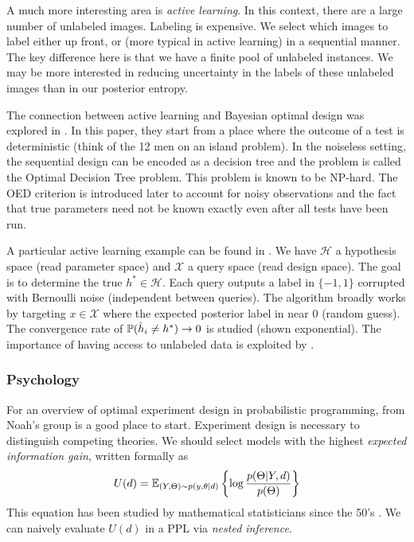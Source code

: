 A much more interesting area is \textit{active learning}. In this context, there are a large number of unlabeled images. Labeling is expensive. We select which images to label either up front, or (more typical in active learning) in a sequential manner. The key difference here is that we have a finite pool of unlabeled instances. We may be more interested in reducing uncertainty in the labels of these unlabeled images than in our posterior entropy.

The connection between active learning and Bayesian optimal design was explored in \cite{golovin2010}. In this paper, they start from a place where the outcome of a test is deterministic (think of the 12 men on an island problem). In the noiseless setting, the sequential design can be encoded as a decision tree and the problem is called the Optimal Decision Tree problem. This problem is known to be NP-hard. The OED criterion is introduced later to account for noisy observations and the fact that true parameters need not be known exactly even after all tests have been run.

A particular active learning example can be found in \cite{nowak2009}. We have $\mathcal{H}$ a hypothesis space (read parameter space) and $\mathcal{X}$ a query space (read design space). The goal is to determine the true $h^* \in \mathcal{H}$. Each query outputs a label in $\{-1, 1\}$ corrupted with Bernoulli noise (independent between queries). The algorithm broadly works by targeting $x \in \mathcal{X}$ where the expected posterior label in near $0$ (random guess). The convergence rate of $\mathbb{P}(\hat{h}_i \ne h^*) \to 0$ is studied (shown exponential). The importance of having access to unlabeled data is exploited by \cite{dasgupta2006}.

\subsubsection{Psychology}
For an overview of optimal experiment design in probabilistic programming, \cite{ouyang2016} from Noah's group is a good place to start. Experiment design is necessary to distinguish competing theories. We should select models with the highest \textit{expected information gain}, written formally as 
\begin{equation}
U(d) = \mathbb{E}_{(Y, \Theta) \sim p(y, \theta | d)}\left\{\log \frac{p(\Theta | Y, d)}{p(\Theta)}\right\}
\end{equation}
This equation has been studied by mathematical statisticians since the 50's \cite{lindley1956}. We can naively evaluate $U(d)$ in a PPL via \textit{nested inference}.

